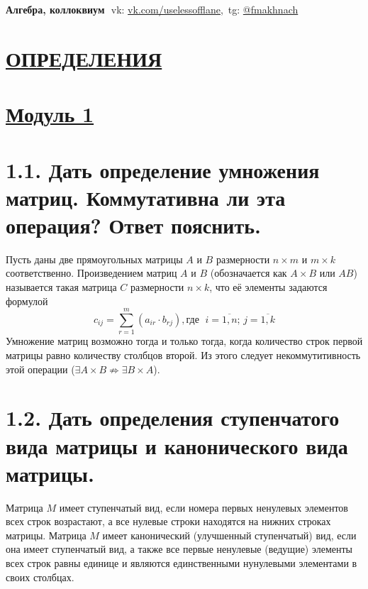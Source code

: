 \documentclass{article}
\begin{document}
\textbf{\huge Алгебра, коллоквиум}
\Large
\newline $ $
\newline vk: \href{https://vk.com/uselessofflane}{\color{blue}vk.com/uselessofflane},\, tg: \href{https://t.me/fmakhnach}{\color{blue}@fmakhnach}

\tableofcontents

\section*{\LARGE\centering \underline{ОПРЕДЕЛЕНИЯ}}

\section*{\LARGE\centering \underline{Модуль 1}}

\section*{\LARGE 1.1. Дать определение умножения матриц. Коммутативна ли эта операция? Ответ пояснить.}

Пусть даны две прямоугольных матрицы $A$ и $B$ размерности $n \times m$ и $m \times k$ соответственно. Произведением матриц $A$ и $B$ (обозначается как $A \times B$ или $AB$) называется такая матрица $C$ размерности $n \times k$, что её элементы задаются формулой 
$$
c_{ij} = \sum_{r = 1}^{m}(a_{ir}\cdot b_{rj}), \mbox{где }\; i = \overline{1, n};\, j = \overline{1, k}
$$
Умножение матриц возможно тогда и только тогда, когда количество строк первой матрицы равно количеству столбцов второй. Из этого следует некоммутитивность этой операции ($\exists A \times B \not\Rightarrow \exists B \times A$).

\section*{\LARGE 1.2. Дать определения ступенчатого вида матрицы и канонического вида матрицы. }


Матрица $M$ имеет ступенчатый вид, если номера первых ненулевых элементов всех строк возрастают, а все нулевые строки находятся на нижних строках матрицы.
\newline Матрица $M$ имеет канонический (улучшенный ступенчатый) вид, если она имеет ступенчатый вид, а также все первые ненулевые (ведущие) элементы всех строк равны единице и являются единственными нунулевыми элементами в своих столбцах.
\end{document}
